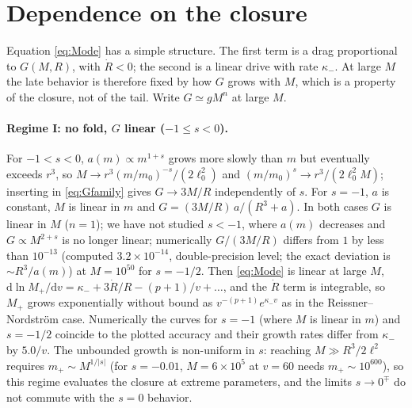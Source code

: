 \documentclass[11pt]{article}
\newcommand{\dd}{\mathrm{d}}
\begin{document}
\section{Dependence on the closure}
\label{sec:classes}

Equation \eqref{eq:Mode} has a simple structure. The first term is a drag proportional to $G(M,R)$, with $\dot R<0$; the second is a linear drive with rate $\kappa_-$. At large $M$ the late behavior is therefore fixed by how $G$ grows with $M$, which is a property of the closure, not of the tail. Write $G\simeq gM^n$ at large $M$.

\paragraph{Regime I: no fold, $G$ linear ($-1\le s<0$).} For $-1<s<0$, $a(m)\propto m^{1+s}$ grows more slowly than $m$ but eventually exceeds $r^3$, so $M\to r^3(m/m_0)^{-s}/(2\ell_0^2)$ and $(m/m_0)^s\to r^3/(2\ell_0^2M)$; inserting in \eqref{eq:Gfamily} gives $G\to3M/R$ independently of $s$. For $s=-1$, $a$ is constant, $M$ is linear in $m$ and $G=(3M/R)\,a/(R^3+a)$. In both cases $G$ is linear in $M$ ($n=1$); we have not studied $s<-1$, where $a(m)$ decreases and $G\propto M^{2+s}$ is no longer linear; numerically $G/(3M/R)$ differs from $1$ by less than $10^{-13}$ (computed $3.2\times10^{-14}$, double-precision level; the exact deviation is $\sim R^3/a(m)$) at $M=10^{50}$ for $s=-1/2$. Then \eqref{eq:Mode} is linear at large $M$, $\dd\ln M_+/\dd v=\kappa_-+3\dot R/R-(p+1)/v+\dots$, and the $\dot R$ term is integrable, so $M_+$ grows exponentially without bound as $v^{-(p+1)}e^{\kappa_-v}$ as in the Reissner--Nordstr\"om case. Numerically the curves for $s=-1$ (where $M$ is linear in $m$) and $s=-1/2$ coincide to the plotted accuracy and their growth rates differ from $\kappa_-$ by $5.0/v$. The unbounded growth is non-uniform in $s$: reaching $M\gg R^3/2\ell^2$ requires $m_+\sim M^{1/|s|}$ (for $s=-0.01$, $M=6\times10^{5}$ at $v=60$ needs $m_+\sim10^{600}$), so this regime evaluates the closure at extreme parameters, and the limits $s\to0^\mp$ do not commute with the $s=0$ behavior.
\end{document}
